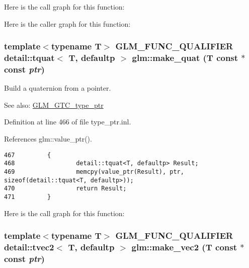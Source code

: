 Here is the call graph for this function:

Here is the caller graph for this function:\hypertarget{group__gtc__type__ptr_gac5b8f1104856835d3d65d854362c85b}{
\subsubsection[make\_\-quat]{\setlength{\rightskip}{0pt plus 5cm}template$<$typename T$>$ GLM\_\-FUNC\_\-QUALIFIER detail::tquat$<$ T, defaultp $>$ glm::make\_\-quat (T const $\ast$const  {\em ptr})}}
\label{group__gtc__type__ptr_gac5b8f1104856835d3d65d854362c85b}


Build a quaternion from a pointer. \begin{Desc}
\item[See also:]\hyperlink{group__gtc__type__ptr}{GLM\_\-GTC\_\-type\_\-ptr} \end{Desc}


Definition at line 466 of file type\_\-ptr.inl.

References glm::value\_\-ptr().

\begin{Code}\begin{verbatim}467         {
468                 detail::tquat<T, defaultp> Result;
469                 memcpy(value_ptr(Result), ptr, sizeof(detail::tquat<T, defaultp>));
470                 return Result;
471         }
\end{verbatim}
\end{Code}




Here is the call graph for this function:\hypertarget{group__gtc__type__ptr_g7009d8090f046d1ce98e59df584fff46}{
\subsubsection[make\_\-vec2]{\setlength{\rightskip}{0pt plus 5cm}template$<$typename T$>$ GLM\_\-FUNC\_\-QUALIFIER detail::tvec2$<$ T, defaultp $>$ glm::make\_\-vec2 (T const $\ast$const  {\em ptr})}}
\label{group__gtc__type__ptr_g7009d8090f046d1ce98e59df584fff46}


